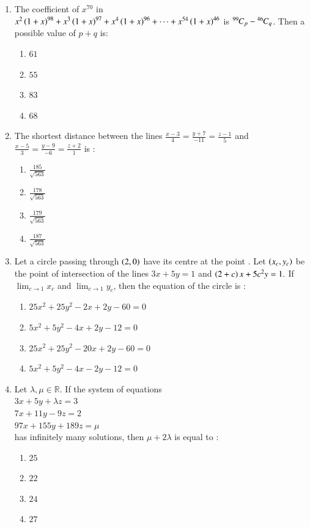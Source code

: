 \documentclass[journal,12pt,onecolumn]{IEEEtran}
\theoremstyle{remark}
\begin{document}
\begin{enumerate}
\item The coefficient of $x^{70}$ in $x^2\left(1+x\right)^{98}+x^3\left(1+x\right)^{97}+x^4\left(1+x\right)^{96}+\cdots+x^{54}\left(1+x\right)^{46}$ is ${{}^{99}\mkern-1muC_{p}}-{{}^{46}\mkern-1muC_{q}}$. Then a possible value of $p + q$ is:
     \begin{enumerate}
     \item $61$ \item $55$ \item $83$ \item $68$
     \end{enumerate}
\item The shortest distance between the lines $\frac{x-3}{4}=\frac{y+7}{-11}=\frac{z-1}{5}$ and $\frac{x-5}{3}=\frac{y-9}{-6}=\frac{z+2}{1}$ is :
     \begin{enumerate}
     \item $\frac{185}{\sqrt{563}}$ 
     \item $\frac{178}{\sqrt{563}}$
     \item $\frac{179}{\sqrt{563}}$
     \item $\frac{187}{\sqrt{563}}$
     \end{enumerate}
\item Let a circle passing through $\left(2,0\right)$ have its centre at the point . Let $\left(x_c,y_c\right)$ be the point of intersection of the lines $3x+5y=1$ and $\left(2+c\right)x+5c^2y=1.$ If $\displaystyle \lim_{c \to 1}x_c$ and $\displaystyle \lim_{c \to 1}y_c$, then the equation of the circle is :
     \begin{enumerate}
     \item $25x^2+25y^2-2x+2y-60=0$
     \item $5x^2+5y^2-4x+2y-12=0$
     \item $25x^2+25y^2-20x+2y-60=0$
     \item $5x^2+5y^2-4x-2y-12=0$
     \end{enumerate}
\item Let $\lambda,\mu \in \mathbb{R}.$ If the system of equations\\
	$3x+5y+\lambda z=3$\\
	$7x+11y-9z=2$\\
	$97x+155y+189z=\mu $\\
	has infinitely many solutions, then $\mu +2\lambda$ is equal to :
     \begin{enumerate}
     \item $25$ \item $22$ \item $24$ \item $27$

\end{enumerate}
\end{enumerate}
\end{document}

